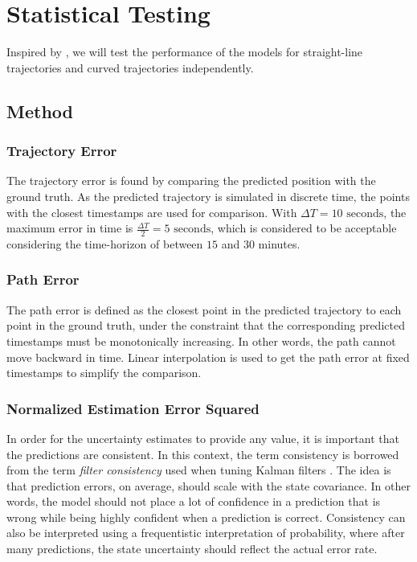 \chapter{Statistical Testing}\label{chap:stat_testing}
Inspired by \cite{hexeberg}, we will test the performance of the models for straight-line trajectories and curved trajectories independently.

\section{Method}
\subsection{Trajectory Error}
The trajectory error is found by comparing the predicted position with the ground truth. As the predicted trajectory is simulated in discrete time, the points with the closest timestamps are used for comparison. With $\Delta T = 10\text{ seconds}$, the maximum error in time is $\frac{\Delta T}{2} = 5 \text{ seconds}$, which is considered to be acceptable considering the time-horizon of between $15$ and $30$ minutes.
\subsection{Path Error}
The path error is defined as the closest point in the predicted trajectory to each point in the ground truth, under the constraint that the corresponding predicted timestamps must be monotonically increasing. In other words, the path cannot move backward in time. Linear interpolation is used to get the path error at fixed timestamps to simplify the comparison.

\subsection{Normalized Estimation Error Squared}
In order for the uncertainty estimates to provide any value, it is important that the predictions are consistent. In this context, the term consistency is borrowed from the term \textit{filter consistency} used when tuning Kalman filters \cite{sensorfusjon}. The idea is that prediction errors, on average, should scale with the state covariance. In other words, the model should not place a lot of confidence in a prediction that is wrong while being highly confident when a prediction is correct. Consistency can also be interpreted using a frequentistic interpretation of probability, where after many predictions, the state uncertainty should reflect the actual error rate.

